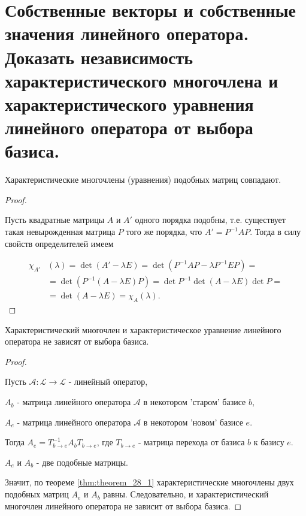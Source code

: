 \section{
    Собственные векторы и собственные значения линейного оператора. Доказать независимость характеристического многочлена и характеристического уравнения линейного оператора от выбора базиса.
}

\begin{theorem}
    Характеристические многочлены (уравнения) подобных матриц совпадают.
\end{theorem}

\begin{proof}~

    Пусть квадратные матрицы $A$ и $A'$ одного порядка подобны, т.е. существует такая невырожденная матрица $P$ того же порядка, что $A' = P^{-1}AP$. Тогда в силу свойств определителей имеем

    \begin{align*}
        \chi_{A'}&(\lambda) = \det(A' - \lambda E) = \det(P^{-1}AP - \lambda P^{-1}EP) = \\
        &=\det(P^{-1}(A - \lambda E)P) = \det P^{-1}\det(A - \lambda E)\det P = \\
        &=\det(A - \lambda E) = \chi_A(\lambda).
    \end{align*}
\end{proof}

\begin{theorem}
    Характеристический многочлен и характеристическое уравнение линейного оператора не зависят от выбора базиса.
    \label{thm:theorem_28_1}
\end{theorem}

\begin{proof}~

    Пусть $\mathscr{A} \colon \mathcal{L} \to \mathcal{L}$ - линейный оператор, 
    
    $A_b$ - матрица линейного оператора $\mathscr{A}$ в некотором 'старом' базисе $b$, 
    
    $A_e$ - матрица линейного оператора $\mathscr{A}$  в некотором 'новом' базисе $e$.

    Тогда $A_e = T^{-1}_{b \to e}A_bT_{b \to e}$, где $T_{b \to e}$ - матрица перехода от базиса $b$ к базису $e$.

    $A_e$ и $A_b$ - две подобные матрицы.

    Значит, по теореме \ref{thm:theorem_28_1} характеристические многочлены двух подобных матриц $A_e$ и $A_b$ равны. Следовательно, и характеристический многочлен линейного оператора не зависит от выбора базиса.
\end{proof}
